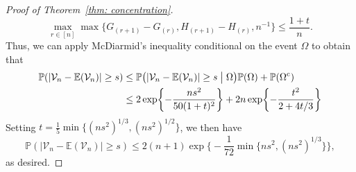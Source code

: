 \documentclass[11pt]{article}
\begin{document}
\begin{proof}[Proof of Theorem~\ref{thm: concentration}]
\[  
\max_{r\in[n]} \max\{G_{(r+1)}-G_{(r)}, H_{(r+1)}-H_{(r)}, n^{-1}\} \leq \frac{1+t}{n}.
\]
Thus, we can apply McDiarmid's inequality conditional on the event $\Omega$ to obtain that 
\begin{align*}
\mathbb{P}(|\mathcal{V}_n - \mathbb{E}(\mathcal{V}_n)| \geq s) &\leq \mathbb{P}\bigl(|\mathcal{V}_n - \mathbb{E}(\mathcal{V}_n)| \geq s \bigm| \Omega\bigr)\mathbb{P}(\Omega) + \mathbb{P}(\Omega^{\mathrm{c}})\\
&\leq 2\exp\biggl\{-\frac{ns^2}{50(1+t)^2}\biggr\} + 2n\exp\biggl\{-\frac{t^2}{2+4t/3}\biggr\}
\end{align*}
Setting $t = \frac{1}{5}\min\{(ns^2)^{1/3}, (ns^2)^{1/2}\}$, we then have 
\[  
\mathbb{P}(|\mathcal{V}_n - \mathbb{E}(\mathcal{V}_n)| \geq s) \leq 2(n+1)\exp\biggl\{-\frac{1}{72}\min\{ns^2, (ns^2)^{1/3}\}\biggr\},
\]
as desired.
\end{proof}
\end{document}
